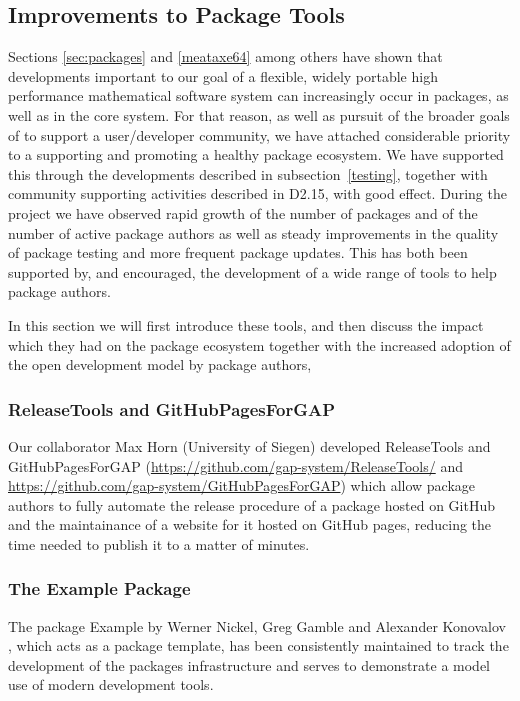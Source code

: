\subsection{Improvements to \GAP Package Tools}\label{sec:package-tools}

Sections \ref{sec:packages} and \ref{meataxe64} among others have shown
that developments important to our goal of a flexible, widely portable high performance
mathematical software system can increasingly occur in packages, as
well as in the core \GAP system. For that reason, as well as pursuit
of the broader goals of \ODK to support a user/developer community, we have attached
considerable priority to a supporting and promoting a healthy \GAP
package ecosystem. We have supported this through the developments
described in subsection~\ref{testing}, together with community
supporting activities described in D2.15,  with
good effect. During the \ODK
project we have observed rapid growth of the number of \GAP packages
and of the number of active package
authors as well as steady improvements in the quality of package testing and more frequent
package updates. This has both been supported by, and encouraged, the
development of a wide range of tools to help package authors.

In this section we will first introduce these tools, and then discuss the
impact which they had on the package ecosystem together with the increased
adoption of the open development model by package authors,

\subsubsection{ReleaseTools and GitHubPagesForGAP}
Our collaborator Max Horn (University of Siegen) developed {\sf ReleaseTools}
and {\sf GitHubPagesForGAP} (\url{https://github.com/gap-system/ReleaseTools/}
and \url{https://github.com/gap-system/GitHubPagesForGAP}) which allow package
authors to fully automate the release procedure of a \GAP package hosted on GitHub
and the maintainance of a website for it hosted on GitHub pages,
reducing the time needed to publish it to a matter of minutes.

\subsubsection{The Example Package}
The \GAP package {\sf Example} by Werner Nickel, Greg Gamble and
Alexander Konovalov \cite{example}, which acts as a package template,
has been consistently maintained to track the development of
the packages infrastructure and serves to demonstrate a model use of modern
development tools.

